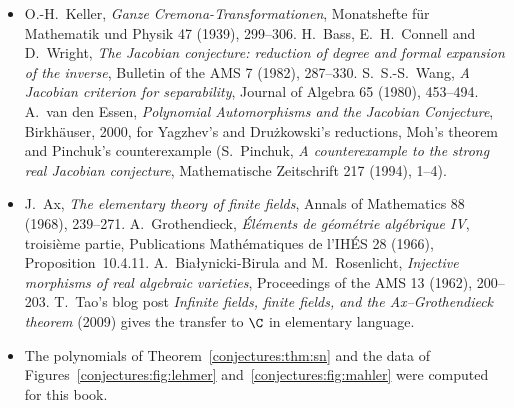 \begin{itemize}
M.~J.~Mossinghoff, \emph{The Mahler measure of polynomials with odd coefficients}, Bulletin of the London Mathematical Society 36 (2004), 332--338.
\item O.-H.~Keller, \emph{Ganze Cremona-Trans\-for\-ma\-tio\-nen}, Monatshefte f\"ur Mathematik und Physik 47 (1939), 299--306. H.~Bass, E.~H.~Connell and
D.~Wright, \emph{The Jacobian conjecture: reduction of degree and formal expansion of the inverse}, Bulletin of the AMS 7 (1982), 287--330. S.~S.-S.~Wang,
\emph{A Jacobian criterion for separability}, Journal of Algebra 65 (1980), 453--494. A.~van den Essen, \emph{Polynomial Automorphisms and the Jacobian
Conjecture}, Birkh\"auser, 2000, for Yagzhev's and Dru\.zkowski's reductions, Moh's theorem and Pinchuk's counterexample (S.~Pinchuk,
\emph{A counterexample to the strong real Jacobian conjecture}, Mathematische Zeitschrift 217 (1994), 1--4).
\item J.~Ax, \emph{The elementary theory of finite fields}, Annals of Mathematics 88 (1968), 239--271. A.~Grothendieck, \emph{\'El\'ements de g\'eom\'etrie
alg\'ebrique IV}, troisi\`eme partie, Publications Math\'ematiques de l'IH\'ES 28 (1966), Proposition~10.4.11. A.~Bia\l ynicki-Birula and M.~Rosenlicht,
\emph{Injective morphisms of real algebraic varieties}, Proceedings of the AMS 13 (1962), 200--203. T.~Tao's blog post \emph{Infinite fields, finite fields, and the
Ax--Grothendieck theorem} (2009) gives the transfer to $\C$ in elementary language.
\item The polynomials of Theorem~\ref{conjectures:thm:sn} and the data of Figures~\ref{conjectures:fig:lehmer} and~\ref{conjectures:fig:mahler} were computed for this book.
\end{itemize}
